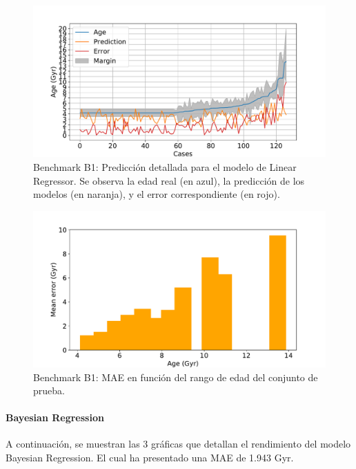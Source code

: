 \begin{figure}[H]
\begin{center}
 \includegraphics[width=0.8\linewidth]{Figuras/Experimentos/B_B1_lr_2.pdf}
\end{center}
\caption{Benchmark B1: Predicción detallada para el modelo de Linear Regressor. Se observa la edad real (en azul), la predicción de los modelos (en naranja), y el error correspondiente (en rojo).}
 \label{fig:benchB1_details_lr_2}
\end{figure}

\begin{figure}[H]
\begin{center}
 \includegraphics[width=0.8\linewidth]{Figuras/Experimentos/B_B1_lr_3.pdf}
\end{center}
\caption{Benchmark B1: MAE en función del rango de edad del conjunto de prueba.}
 \label{fig:benchB1_details_lr_3}
\end{figure}

\paragraph{Bayesian Regression} 
A continuación, se muestran las 3 gráficas que detallan el rendimiento del modelo Bayesian Regression. El cual ha presentado una MAE de 1.943 Gyr.

